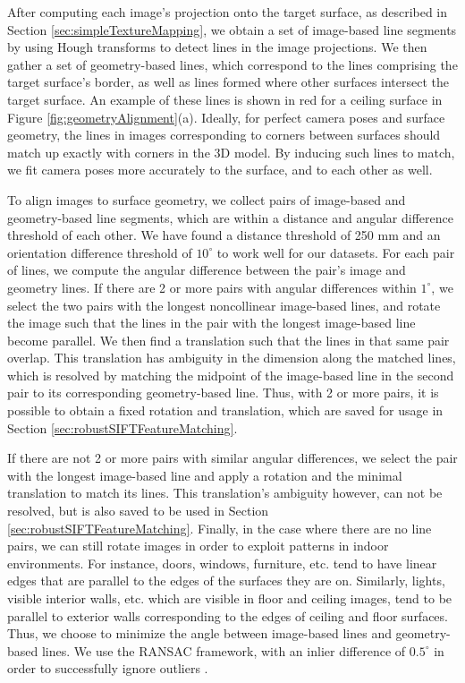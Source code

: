 \documentclass[]{spie}  %
\begin{document}
After computing each image's projection onto the target surface, as
described in Section \ref{sec:simpleTextureMapping}, we obtain a set
of image-based line segments by using Hough transforms to detect lines
in the image projections. We then gather a set of geometry-based
lines, which correspond to the lines comprising the target surface's
border, as well as lines formed where other surfaces intersect the
target surface. An example of these lines is shown in red for a
ceiling surface in Figure \ref{fig:geometryAlignment}(a). Ideally, for
perfect camera poses and surface geometry, the lines in images
corresponding to corners between surfaces should match up exactly with
corners in the 3D model. By inducing such lines to match, we fit
camera poses more accurately to the surface, and to each other as
well.

To align images to surface geometry, we collect pairs of image-based
and geometry-based line segments, which are within a distance and
angular difference threshold of each other. We have found a distance
threshold of 250 mm and an orientation difference threshold of
$10^\circ$ to work well for our datasets. For each pair of lines, we
compute the angular difference between the pair's image and geometry
lines. If there are 2 or more pairs with angular differences within
$1^\circ$, we select the two pairs with the longest noncollinear
image-based lines, and rotate the image such that the lines in the
pair with the longest image-based line become parallel. We then find a
translation such that the lines in that same pair overlap. This
translation has ambiguity in the dimension along the matched lines,
which is resolved by matching the midpoint of the image-based line in
the second pair to its corresponding geometry-based line. Thus, with 2
or more pairs, it is possible to obtain a fixed rotation and
translation, which are saved for usage in Section
\ref{sec:robustSIFTFeatureMatching}.

If there are not 2 or more pairs with similar angular differences, we
select the pair with the longest image-based line and apply a rotation
and the minimal translation to match its lines. This translation's
ambiguity however, can not be resolved, but is also saved to be used
in Section \ref{sec:robustSIFTFeatureMatching}. Finally, in the case
where there are no line pairs, we can still rotate images in order to
exploit patterns in indoor environments. For instance, doors, windows,
furniture, etc. tend to have linear edges that are parallel to the
edges of the surfaces they are on. Similarly, lights, visible interior
walls, etc. which are visible in floor and ceiling images, tend to be
parallel to exterior walls corresponding to the edges of ceiling and
floor surfaces. Thus, we choose to minimize the angle between
image-based lines and geometry-based lines. We use the RANSAC
framework, with an inlier difference of $0.5^\circ$ in order to
successfully ignore outliers \cite{fischler1981random}.
\end{document}

